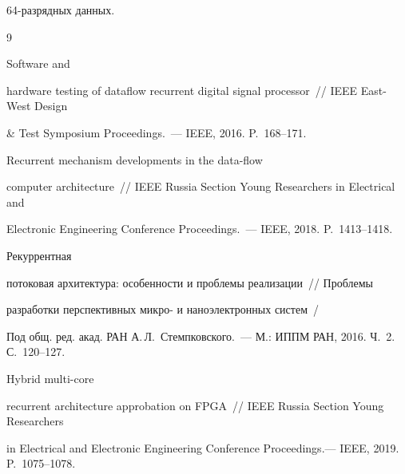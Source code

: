 64-раз\-ряд\-ных данных.



\vspace*{-3pt}

  

{\small\frenchspacing

{%


\begin{thebibliography}{9}


 Software and 

hardware testing of dataflow recurrent digital signal processor~/\!\!/  IEEE East-West Design 

\& Test Symposium Proceedings.~--- IEEE, 2016. P.~168--171.


 Recurrent mechanism developments in the data-flow 

computer architecture~/\!\!/ IEEE Russia Section Young Researchers in Electrical and 

Electronic Engineering Conference Proceedings.~--- IEEE, 2018. P.~1413--1418.


 Рекуррентная 

потоковая архитектура: особенности и проблемы реализации~/\!\!/ Проблемы 

разработки перспективных микро- и наноэлектронных систем~/ 

Под общ. ред. акад. РАН А.\,Л.~Стемпковского.~--- М.: ИППМ РАН, 2016. Ч.~2. С.~120--127.


 Hybrid multi-core 

recurrent architecture approbation on FPGA~/\!\!/  IEEE Russia Section Young Researchers 

in Electrical and Electronic Engineering Conference Proceedings.--- IEEE, 2019. P.~1075--1078.

\end{thebibliography}

} }





